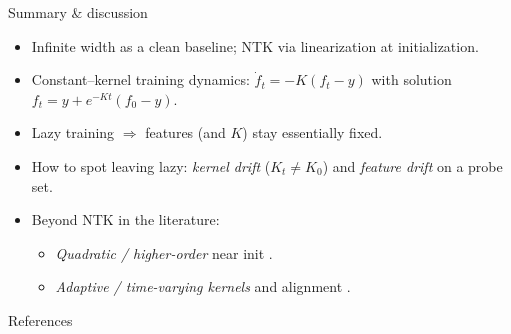 \documentclass[10pt,aspectratio=169]{beamer}
\begin{document}

\begin{frame}{Summary \& discussion}
	\begin{itemize}
		\item Infinite width as a clean baseline; NTK via linearization at initialization.
		\item Constant–kernel training dynamics: $\dot f_t=-K(f_t-y)$ with solution $f_t=y+e^{-Kt}(f_0-y)$.
		\item Lazy training $\Rightarrow$ features (and $K$) stay essentially fixed.
		\item How to spot leaving lazy: \emph{kernel drift} ($K_t\neq K_0$) and \emph{feature drift} on a probe set.
		\item Beyond NTK in the literature:
		      \begin{itemize}
			      \item \emph{Quadratic / higher-order} near init \citep{bai2020beyond}.
			      \item \emph{Adaptive / time-varying kernels} and alignment \citep{zhang2024beyondntk}.
		      \end{itemize}
	\end{itemize}
\end{frame}
\begin{frame}{References}
	
\end{frame}
\end{document}
